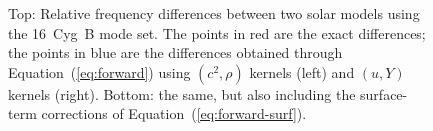 \begin{figure}
{{            }}\hspace*{-1cm}%
    \caption[Verifying the forward problem]{Top: Relative frequency differences between two solar models using the 16~Cyg~B mode set. 
    The points in red are the exact differences; the points in blue are the differences obtained through Equation~(\ref{eq:forward}) using ${(c^2, \rho)}$ kernels (left) and ${(u, Y)}$ kernels (right). 
    Bottom: the same, but also including the surface-term corrections of Equation~(\ref{eq:forward-surf}). 
    }
    \label{fig:forward}
\end{figure}



